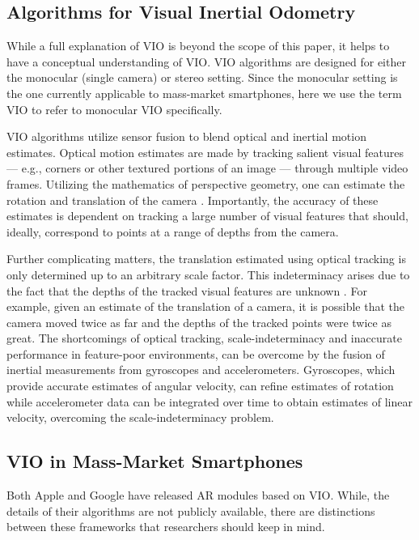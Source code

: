 \documentclass[chi_draft]{sigchi}
\begin{document}
\subsection{Algorithms for Visual Inertial Odometry}
While a full explanation of VIO \cite{gui2015review} is beyond the scope of this paper, it helps to have a conceptual understanding of VIO.  VIO algorithms are designed for either the monocular (single camera) or stereo setting.  Since the monocular setting is the one currently applicable to mass-market smartphones, here we use the term VIO to refer to monocular VIO specifically.

VIO algorithms utilize sensor fusion to blend optical and inertial motion estimates.  Optical motion estimates are made by tracking salient visual features --- e.g., corners or other textured portions of an image --- through multiple video frames.  Utilizing the mathematics of perspective geometry, one can estimate the rotation and translation of the camera \cite{Hartley2004}.  Importantly, the accuracy of these estimates is dependent on tracking a large number of visual features that should, ideally, correspond to points at a range of depths from the camera.%

Further complicating matters, the translation estimated using optical tracking is only determined up to an arbitrary scale factor.  This indeterminacy arises due to the fact that the depths of the tracked visual features are unknown \cite{Hartley2004}.  For example, given an estimate of the translation of a camera, it is possible that the camera moved twice as far and the depths of the tracked points were twice as great.  The shortcomings of optical tracking, scale-indeterminacy and inaccurate performance in feature-poor environments, can be overcome by the fusion of inertial measurements from gyroscopes and accelerometers.  Gyroscopes, which provide accurate estimates of angular velocity, can refine estimates of rotation while accelerometer data can be integrated over time to obtain estimates of linear velocity, overcoming the scale-indeterminacy problem.

\subsection{VIO in Mass-Market Smartphones}
Both Apple and Google have released AR modules based on VIO.  While, the details of their algorithms are not publicly available, there are distinctions between these frameworks that researchers should keep in mind.
\end{document}
